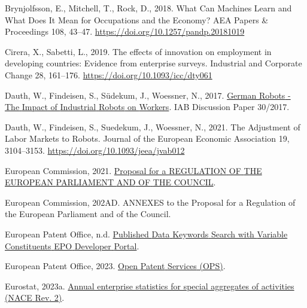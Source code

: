 \documentclass[
  11,
  a4paperpaper,
]{article}
\newlength{\cslhangindent}
\newenvironment{CSLReferences}[2] %
 {\begin{list}{}{%
  \setlength{\itemindent}{0pt}
  \setlength{\leftmargin}{0pt}
  \setlength{\parsep}{0pt}
  \ifodd #1
   \setlength{\leftmargin}{\cslhangindent}
   \setlength{\itemindent}{-1\cslhangindent}
  \fi
  \setlength{\itemsep}{#2\baselineskip}}}
 {\end{list}}
\begin{document}
\begin{CSLReferences}{1}{0}
Brynjolfsson, E., Mitchell, T., Rock, D., 2018. What {Can} {Machines}
{Learn} and {What} {Does} {It} {Mean} for {Occupations} and the
{Economy}? AEA Papers \& Proceedings 108, 43--47.
\url{https://doi.org/10.1257/pandp.20181019}

Cirera, X., Sabetti, L., 2019. The effects of innovation on employment
in developing countries: Evidence from enterprise surveys. Industrial
and Corporate Change 28, 161--176.
\url{https://doi.org/10.1093/icc/dty061}

Dauth, W., Findeisen, S., Südekum, J., Woessner, N., 2017.
\href{https://ssrn.com/abstract=3039031}{German {Robots} - {The}
{Impact} of {Industrial} {Robots} on {Workers}}. IAB Discussion Paper
30/2017.

Dauth, W., Findeisen, S., Suedekum, J., Woessner, N., 2021. The
{Adjustment} of {Labor} {Markets} to {Robots}. Journal of the European
Economic Association 19, 3104--3153.
\url{https://doi.org/10.1093/jeea/jvab012}

European Commission, 2021.
\href{https://eur-lex.europa.eu/legal-content/EN/TXT/HTML/?uri=CELEX:52021PC0206}{Proposal
for a {REGULATION} {OF} {THE} {EUROPEAN} {PARLIAMENT} {AND} {OF} {THE}
{COUNCIL}}.

European Commission, 202AD. {ANNEXES} to the {Proposal} for a
{Regulation} of the {European} {Parliament} and of the {Council}.

European Patent Office, n.d.
\href{https://developers.epo.org/ops-v3-2/apis/get/published-data/search/\%7Bconstituent\%7D}{Published
{Data} {Keywords} {Search} with {Variable} {Constituents} {\textbar}
{EPO} {Developer} {Portal}}.

European Patent Office, 2023.
\href{https://developers.epo.org/ops-v3-2/apis}{Open {Patent} {Services}
({OPS})}.

Eurostat, 2023a.
\href{https://ec.europa.eu/eurostat/databrowser/view/sbs_na_sca_r2/default/table?lang=en}{Annual
enterprise statistics for special aggregates of activities ({NACE}
{Rev}. 2)}.


\end{CSLReferences}
\end{document}
